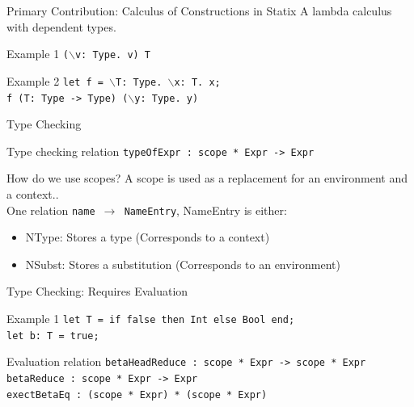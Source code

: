 \documentclass[aspectratio=43]{beamer}
\begin{document}
\begin{frame}[fragile]{Primary Contribution: Calculus of Constructions in Statix}
	A lambda calculus with dependent types.
	
	\begin{exampleblock}{Example 1}
		\texttt{($\backslash$v: Type. v) T}
	\end{exampleblock}

	\begin{exampleblock}{Example 2}
		\texttt{let f = $\backslash$T: Type. $\backslash$x: T. x; \\
f (T: Type -> Type) ($\backslash$y: Type. y)
		}
	\end{exampleblock}
\end{frame}

\begin{frame}[fragile]{Type Checking}
	\begin{block}{Type checking relation}
		\texttt{typeOfExpr : scope * Expr -> Expr}
	\end{block}
	\begin{block}{How do we use scopes?}
		A scope is used as a replacement for an environment and a context..\\
		One relation \texttt{name $\rightarrow$ NameEntry}, NameEntry is either:
		\begin{itemize}
			\item NType: Stores a type (Corresponds to a context)
			\item NSubst: Stores a substitution (Corresponds to an environment)
		\end{itemize}
	\end{block}
\end{frame}

\begin{frame}[fragile]{Type Checking: Requires Evaluation}
	\begin{exampleblock}{Example 1}
		\texttt{let T = if false then Int else Bool end;\\let b: T = true;}
	\end{exampleblock}
	\begin{block}{Evaluation relation} 
		\texttt{betaHeadReduce : scope * Expr -> scope * Expr} \\
		\texttt{betaReduce : scope * Expr -> Expr} \\
		\texttt{exectBetaEq : (scope * Expr) * (scope * Expr)}
	\end{block}
\end{frame}
\end{document}
